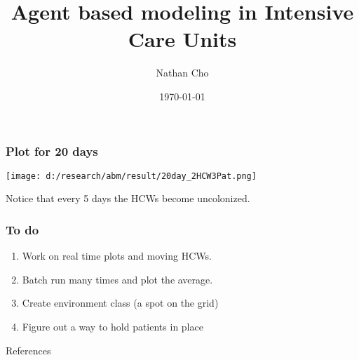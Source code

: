 \documentclass[aspectratio=169, 9pt, xcolor=table]{beamer}
\title{Agent based modeling in Intensive Care Units}
\author{Nathan Cho}
\institute{Computational Science and Engineering}
\date{\today}
\begin{document}
\begin{frame}
    \titlepage
\end{frame}


\begin{frame}
    \frametitle{Plot for 20 days}
    \begin{centering}
    \texttt{[image: d:/research/abm/result/20day\_2HCW3Pat.png]} %
    \end{centering}
Notice that every 5 days the HCWs become uncolonized.
\end{frame}

\begin{frame}
    \frametitle{To do}
    \begin{enumerate}
    \item Work on real time plots and moving HCWs.
    \item Batch run many times and plot the average.
    \item Create environment class (a spot on the grid)
    \item Figure out a way to hold patients in place
    \end{enumerate}
\end{frame}

\begin{frame}[allowframebreaks]{References} %
    
\end{frame}
\end{document}
